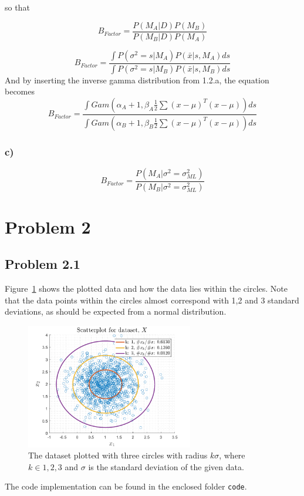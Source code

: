 \documentclass{article}
\begin{document}
so that

\begin{equation}
B_{Factor} = \frac{P(M_A|D)P(M_B) }{P(M_B|D)P(M_A)}
\end{equation}

\begin{equation}
	B_{Factor} = \frac{\int P(\sigma^2= s|M_A)P(\bar{x}|s,M_A) ds}{\int P(\sigma^2 = s|M_B)P(\bar{x}|s,M_B) ds}
\end{equation}
And by inserting the inverse gamma distribution from 1.2.a, the equation becomes
\begin{equation}
	B_{Factor} = \frac{\int Gam(\alpha_A+1,\beta_A \frac{1}{2}\sum(x-\mu)^T(x-\mu))ds}{\int Gam(\alpha_B+1,\beta_B \frac{1}{2}\sum(x-\mu)^T(x-\mu))ds}
\end{equation}


\subsubsection*{c)}

\begin{equation}
B_{Factor}=\frac{P(M_A|\sigma^2=\sigma_{ML}^2)}{P(M_B|\sigma^2=\sigma_{ML}^2)}
\end{equation}

\newpage 

\section*{Problem 2}
\subsection*{Problem 2.1}
Figure~\ref{fig:prob21} shows the plotted data and how the data lies within the circles. Note that the data points within the circles almost correspond with 1,2 and 3 standard deviations, as should be expected from a normal distribution. 
\begin{figure}[H]
	\centering
	\includegraphics[width=0.65\textwidth]{Figures/plot2_1_scatter.png}	\caption{\label{fig:prob21}The dataset plotted with three circles with radius $k\sigma$, where $k\in {1,2,3}$ and $\sigma$ is the standard deviation of the given data.}
\end{figure}
The code implementation can be found in the enclosed folder \verb|code|.
\end{document}
